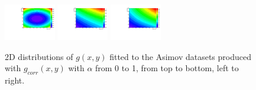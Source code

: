 \begin{figure}[h]
\includegraphics[width=0.2\textwidth]{figures/sec-background/correlation/res_th2F_obs_th2f_res_alpha_08_n005.pdf}
\includegraphics[width=0.2\textwidth]{figures/sec-background/correlation/res_th2F_obs_th2f_res_alpha_09_n005.pdf}
\includegraphics[width=0.2\textwidth]{figures/sec-background/correlation/res_th2F_obs_th2f_res_alpha_10_n005.pdf}
  \caption{2D distributions of $g(x,y)$ fitted to the Asimov datasets produced with  $g_{corr}(x,y)$ with $\alpha$ from 0 to 1, from top to bottom, left to right.}
  \label{fig:g_alpha}
\end{figure}

